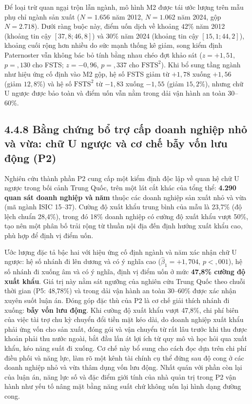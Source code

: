 \documentclass[
  a4paper,
  13pt]{extreport}
\begin{document}
Để loại trừ quan ngại trộn lẫn ngành, mô hình M2 được tái ước lượng trên
mẫu phụ chỉ ngành sản xuất (\(N = 1.656\) năm 2012, \(N = 1.062\) năm
2024, gộp \(N = 2.718\)). Dưới ràng buộc này, điểm uốn dịch về khoảng
\(42\%\) năm 2012 (khoảng tin cậy \([37{,}8; 46{,}8]\)) và \(30\%\) năm
2024 (khoảng tin cậy \([15{,}1; 44{,}2]\)), khoảng cuối rộng hơn nhiều
do sức mạnh thống kê giảm, song kiểm định Paternoster vẫn không bác bỏ
tính bằng nhau chéo đợt khảo sát (\(z = +1{,}51\), \(p = {,}130\) cho
FSTS; \(z = -0{,}96\), \(p = {,}337\) cho \(\mathrm{FSTS}^2\)). Khi bổ
sung tầng ngành như hiệu ứng cố định vào M2 gộp, hệ số FSTS giảm từ
\(+1{,}78\) xuống \(+1{,}56\) (giảm \(12{,}8\%\)) và hệ số
\(\mathrm{FSTS}^2\) từ \(-1{,}83\) xuống \(-1{,}55\) (giảm
\(15{,}2\%\)), nhưng chữ U ngược được bảo toàn và điểm uốn vẫn nằm trong
dải vận hành an toàn 30--60\%.

\hypertarget{bux1eb1ng-chux1ee9ng-bux1ed5-trux1ee3-cux1ea5p-doanh-nghiux1ec7p-nhux1ecf-vuxe0-vux1eeba-chux1eef-u-ngux1b0ux1ee3c-vuxe0-cux1a1-chux1ebf-bux1eaby-vux1ed1n-lux1b0u-ux111ux1ed9ng-p2}{%
\subsection{4.4.8 Bằng chứng bổ trợ cấp doanh nghiệp nhỏ và vừa: chữ U
ngược và cơ chế bẫy vốn lưu động
(P2)}\label{bux1eb1ng-chux1ee9ng-bux1ed5-trux1ee3-cux1ea5p-doanh-nghiux1ec7p-nhux1ecf-vuxe0-vux1eeba-chux1eef-u-ngux1b0ux1ee3c-vuxe0-cux1a1-chux1ebf-bux1eaby-vux1ed1n-lux1b0u-ux111ux1ed9ng-p2}}

Nghiên cứu thành phần P2 cung cấp một kiểm định độc lập về quan hệ chữ U
ngược trong bối cảnh Trung Quốc, trên một lát cắt khác của tổng thể:
\textbf{4.290 quan sát doanh nghiệp và năm} thuộc các doanh nghiệp sản
xuất nhỏ và vừa (mã ngành ISIC 15--37). Cường độ xuất khẩu trung bình
của mẫu là 23,7\% (độ lệch chuẩn 28,4\%), trong đó 18\% doanh nghiệp có
cường độ xuất khẩu vượt 50\%, tạo nên một phân bố trải rộng từ thuần nội
địa đến định hướng xuất khẩu cao, phù hợp để định vị điểm uốn.

Ước lượng đặc tả bậc hai với hiệu ứng cố định ngành và năm xác nhận chữ
U ngược: hệ số nhánh đi lên dương và có ý nghĩa cao
(\(\hat{\beta}_1 = +1{,}704\), \(p < {,}001\)), hệ số nhánh đi xuống âm
và có ý nghĩa, định vị điểm uốn ở mức \textbf{47,8\% cường độ xuất
khẩu}. Giá trị này nằm sát ngưỡng của nghiên cứu Trung Quốc theo chuỗi
thời gian (P5: 48,78\%) và trong dải vận hành an toàn 30--60\% được xác
nhận xuyên suốt luận án. Đóng góp đặc thù của P2 là cơ chế giải thích
nhánh đi xuống: \textbf{bẫy vốn lưu động}. Khi cường độ xuất khẩu vượt
47,8\%, chi phí biên của việc tài trợ chu kỳ chuyển đổi tiền mặt kéo
dài, do doanh nghiệp xuất khẩu phải ứng vốn cho sản xuất, đóng gói và
vận chuyển từ rất lâu trước khi thu được khoản phải thu nước ngoài, bắt
đầu lấn át lợi ích từ quy mô và học hỏi qua xuất khẩu, kéo năng suất đi
xuống. Cơ chế này bổ sung cho cách đọc dựa trên chi phí điều phối và
năng lực, làm rõ một kênh tài chính cụ thể đứng sau độ cong ở các doanh
nghiệp nhỏ và vừa thâm dụng vốn lưu động. Nhất quán với phần còn lại của
luận án, năng lực số và đặc điểm giới tính của nhà quản trị trong P2 vận
hành như yếu tố nâng mặt bằng năng suất chứ không uốn lại hình dạng
đường cong.
\end{document}
